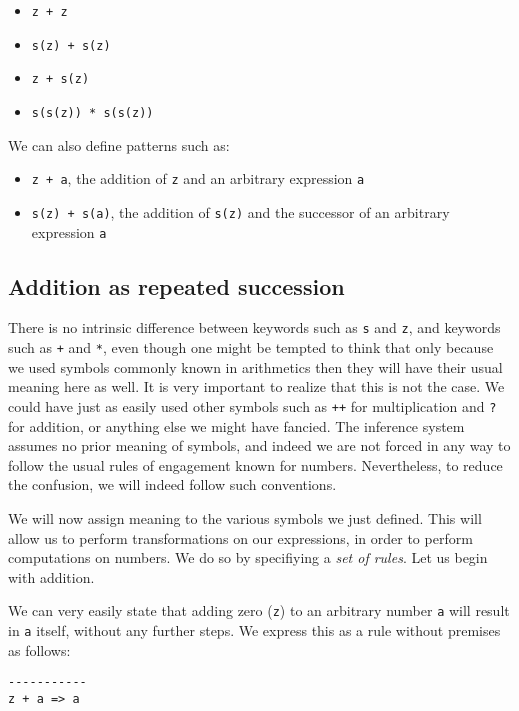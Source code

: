 \begin{itemize}
\item \texttt{z + z}
\item \texttt{s(z) + s(z)}
\item \texttt{z + s(z)}
\item \texttt{s(s(z)) * s(s(z))}
\end{itemize}

We can also define patterns such as:

\begin{itemize}
\item \texttt{z + a}, the addition of \texttt{z} and an arbitrary expression \texttt{a}
\item \texttt{s(z) + s(a)}, the addition of \texttt{s(z)} and the successor of an arbitrary expression \texttt{a}
\end{itemize}

\subsection{Addition as repeated succession}
There is no intrinsic difference between keywords such as \texttt{s} and \texttt{z}, and keywords such as \texttt{+} and \texttt{*}, even though one might be tempted to think that only because we used symbols commonly known in arithmetics then they will have their usual meaning here as well. It is very important to realize that this is not the case. We could have just as easily used other symbols such as \texttt{++} for multiplication and \texttt{?} for addition, or anything else we might have fancied. The inference system assumes no prior meaning of symbols, and indeed we are not forced in any way to follow the usual rules of engagement known for numbers. Nevertheless, to reduce the confusion, we will indeed follow such conventions. 

We will now assign meaning to the various symbols we just defined. This will allow us to perform transformations on our expressions, in order to perform computations on numbers. We do so by specifiying a \textit{set of rules}. Let us begin with addition.

We can very easily state that adding zero (\texttt{z}) to an arbitrary number \texttt{a} will result in \texttt{a} itself, without any further steps. We express this as a rule without premises as follows:

\begin{lstlisting}
-----------
z + a => a
\end{lstlisting}

